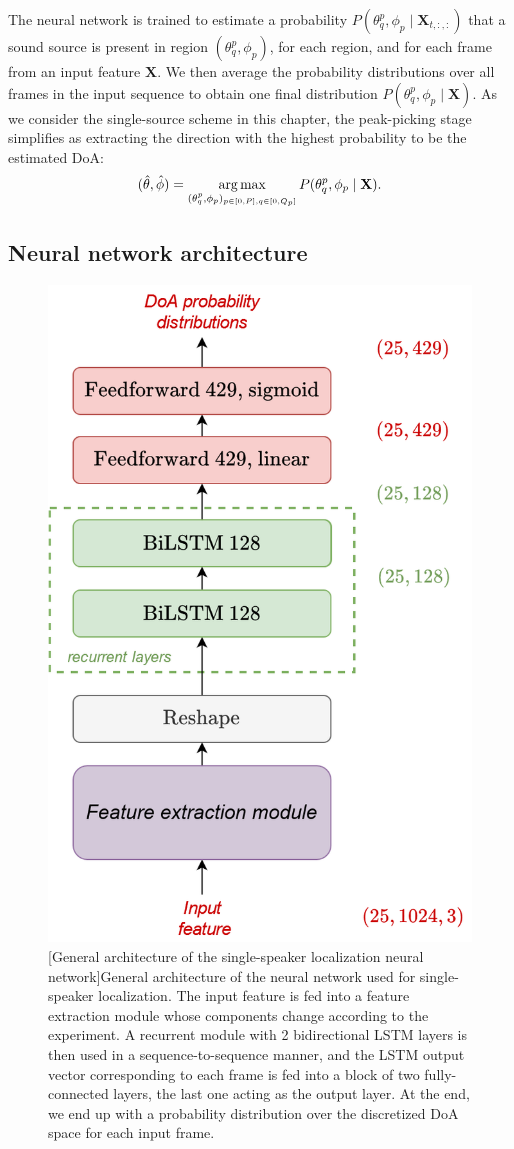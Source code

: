 The neural network is trained to estimate a probability $P(\theta_q^p, \phi_p \mid \mathbf{X}_{t,:,:})$ that a sound source is present in region $(\theta_q^p, \phi_p)$, for each region, and for each frame from an input feature $\mathbf{X}$. We then average the probability distributions over all frames in the input sequence to obtain one final distribution $P(\theta_q^p, \phi_p \mid \mathbf{X})$. As we consider the single-source scheme in this chapter, the peak-picking stage simplifies as extracting the direction with the highest probability to be the estimated DoA:
\begin{equation}
    (\hat{\theta},\hat{\phi}) = \operatorname*{arg\,max}_{(\theta_q^p,\phi_p)_{p \in [0,P],q\in[0,Q_p]}} P(\theta_q^p,\phi_p \mid \mathbf{X}).
\end{equation}

\subsection{Neural network architecture}

\begin{figure}[t]
    \begin{center}
    \includegraphics[width=0.5\linewidth]{Images/chap6/genericTDVVnetworkArchitecture.png}
    [General architecture of the single-speaker localization neural network]{General architecture of the neural network used for single-speaker localization. The input feature is fed into a feature extraction module whose components change according to the experiment. A recurrent module with 2 bidirectional LSTM layers is then used in a sequence-to-sequence manner, and the LSTM output vector corresponding to each frame is fed into a block of two fully-connected layers, the last one acting as the output layer. At the end, we end up with a probability distribution over the discretized DoA space for each input frame.}
    \label{fig:genericTDVVnetworkArchitecture}
    \end{center}
\end{figure}

